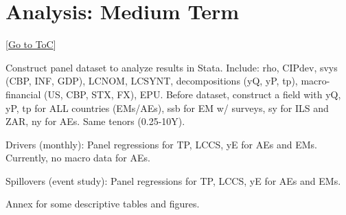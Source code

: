 \documentclass[12pt]{article}
\newcommand{\gototoc}{\vspace{-1.8cm} \null\hfill [\hyperlink{toc}{Go to ToC}] \newline}
\begin{document}
\section{Analysis: Medium Term}
\gototoc
\begin{todolist}
	\item Construct panel dataset to analyze results in Stata. Include: rho, CIPdev, svys (CBP, INF, GDP), LCNOM, LCSYNT, decompositions (yQ, yP, tp), macro-financial (US, CBP, STX, FX), EPU. Before dataset, construct a field with yQ, yP, tp for ALL countries (EMs/AEs), ssb for EM w/ surveys, sy for ILS and ZAR, ny for AEs. Same tenors (0.25-10Y).
	\item Drivers (monthly): Panel regressions for TP, LCCS, yE for AEs and EMs. Currently, no macro data for AEs.
	\item Spillovers (event study): Panel regressions for TP, LCCS, yE for AEs and EMs.
	\item Annex for some descriptive tables and figures.
\end{todolist}
\end{document}
